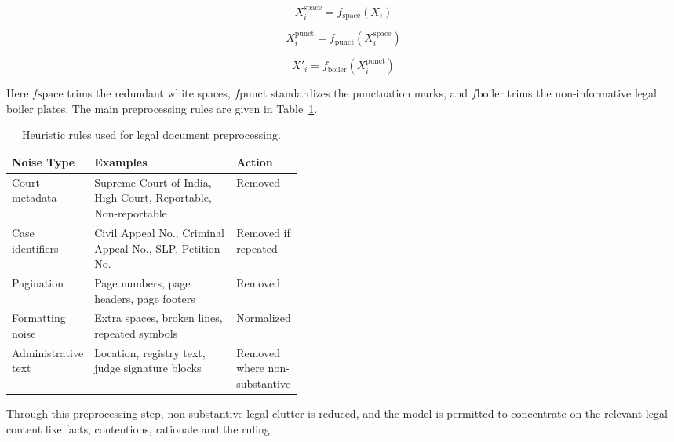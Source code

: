 \documentclass[11pt, a4paper]{article}
\theoremstyle{plain}%
\theoremstyle{remark}%
\theoremstyle{definition}%
\begin{document}
\begin{equation}
X_i^{\text{space}}=f_{\text{space}}(X_i)
\end{equation}

\begin{equation}
X_i^{\text{punct}}=f_{\text{punct}}(X_i^{\text{space}})
\end{equation}

\begin{equation}
X'_i=f_{\text{boiler}}(X_i^{\text{punct}})
\end{equation}

Here $f{\text{space}}$ trims the redundant white spaces, $f{\text{punct}}$ standardizes the punctuation marks, and $f{\text{boiler}}$ trims the non-informative legal boiler plates. The main preprocessing rules are given in Table~\ref{tab:cleaning_rules}.

\begin{table}[H]
\centering
\caption{Heuristic rules used for legal document preprocessing.}
\label{tab:cleaning_rules}
\renewcommand{\arraystretch}{1.25}
\setlength{\tabcolsep}{4pt}
\begin{tabularx}{\linewidth}{@{}p{0.25\linewidth}X p{0.18\linewidth}@{}}
\toprule
\textbf{Noise Type} & \textbf{Examples} & \textbf{Action} \\
\midrule
Court metadata & Supreme Court of India, High Court, Reportable, Non-reportable & Removed \\
Case identifiers & Civil Appeal No., Criminal Appeal No., SLP, Petition No. & Removed if repeated \\
Pagination & Page numbers, page headers, page footers & Removed \\
Formatting noise & Extra spaces, broken lines, repeated symbols & Normalized \\
Administrative text & Location, registry text, judge signature blocks & Removed where non-substantive \\
\bottomrule
\end{tabularx}
\end{table}

Through this preprocessing step, non-substantive legal clutter is reduced, and the model is permitted to concentrate on the relevant legal content like facts, contentions, rationale and the ruling.
\end{document}
